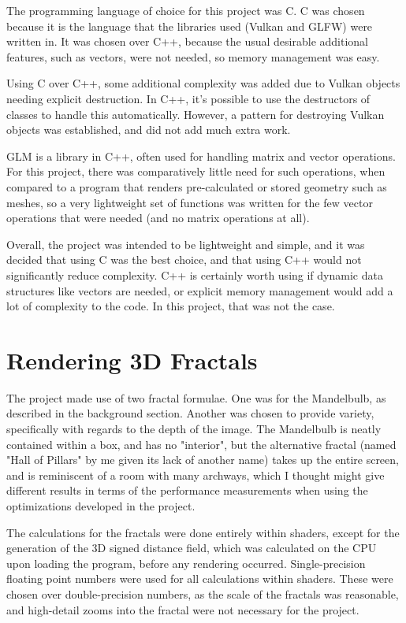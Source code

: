 The programming language of choice for this project was C. C was chosen because it is the language that the libraries used (Vulkan and GLFW) were written in. It was chosen over C++, because the usual desirable additional features, such as vectors, were not needed, so memory management was easy.\newline

Using C over C++, some additional complexity was added due to Vulkan objects needing explicit destruction. In C++, it's possible to use the destructors of classes to handle this automatically. However, a pattern for destroying Vulkan objects was established, and did not add much extra work.\newline

GLM is a library in C++, often used for handling matrix and vector operations. For this project, there was comparatively little need for such operations, when compared to a program that renders pre-calculated or stored geometry such as meshes, so a very lightweight set of functions was written for the few vector operations that were needed (and no matrix operations at all).\newline

Overall, the project was intended to be lightweight and simple, and it was decided that using C was the best choice, and that using C++ would not significantly reduce complexity. C++ is certainly worth using if dynamic data structures like vectors are needed, or explicit memory management would add a lot of complexity to the code. In this project, that was not the case.

\section{Rendering 3D Fractals}

The project made use of two fractal formulae. One was for the Mandelbulb, as described in the background section. Another was chosen to provide variety, specifically with regards to the depth of the image. The Mandelbulb is neatly contained within a box, and has no "interior", but the alternative fractal (named "Hall of Pillars" by me given its lack of another name) takes up the entire screen, and is reminiscent of a room with many archways, which I thought might give different results in terms of the performance measurements when using the optimizations developed in the project.\newline

The calculations for the fractals were done entirely within shaders, except for the generation of the 3D signed distance field, which was calculated on the CPU upon loading the program, before any rendering occurred. Single-precision floating point numbers were used for all calculations within shaders. These were chosen over double-precision numbers, as the scale of the fractals was reasonable, and high-detail zooms into the fractal were not necessary for the project.

